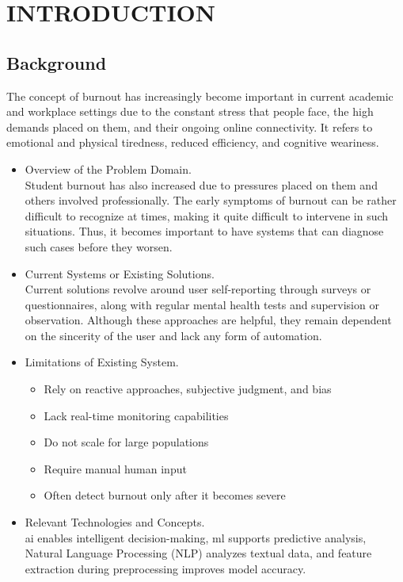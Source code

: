 \chapter{\MakeUppercase{Introduction}}
\justifying
\section{Background}
 The concept of burnout has increasingly become important in current academic and workplace settings due to the constant stress that people face, the high demands placed on them, and their ongoing online connectivity. It refers to emotional and physical tiredness, reduced efficiency, and cognitive weariness.

\begin{itemize}
    \item Overview of the Problem Domain. \\
    Student burnout has also increased due to pressures placed on them and others involved professionally. The early symptoms of burnout can be rather difficult to recognize at times, making it quite difficult to intervene in such situations. Thus, it becomes important to have systems that can diagnose such cases before they worsen.
	\item Current Systems or Existing Solutions. \\ 
    Current solutions revolve around user self-reporting through surveys or questionnaires, along with regular mental health tests and supervision or observation. Although these approaches are helpful, they remain dependent on the sincerity of the user and lack any form of automation.
	\item Limitations of Existing System. 
\vspace{-0.5em}
\begin{itemize}
    \item Rely on reactive approaches, subjective judgment, and bias
    \item Lack real-time monitoring capabilities
    \item Do not scale for large populations
    \item Require manual human input
    \item Often detect burnout only after it becomes severe
\end{itemize}
	\item Relevant Technologies and Concepts. \\
    \ac{ai} enables intelligent decision-making, \ac{ml} supports predictive analysis, Natural Language Processing (NLP) analyzes textual data, and feature extraction during preprocessing improves model accuracy.

\end{itemize}
